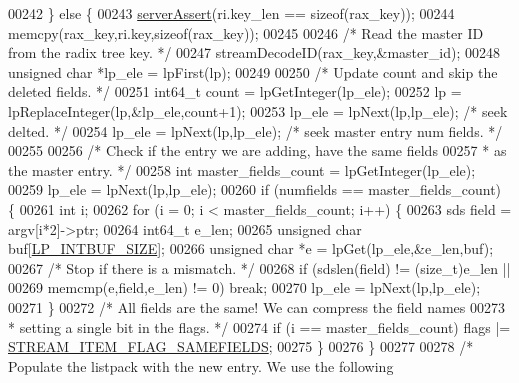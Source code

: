 \begin{DoxyCode}
{00242     \} \textcolor{keywordflow}{else} \{
00243         \hyperlink{server_8h_a88114b5169b4c382df6b56506285e56a}{serverAssert}(ri.key\_len == \textcolor{keyword}{sizeof}(rax\_key));
00244         memcpy(rax\_key,ri.key,\textcolor{keyword}{sizeof}(rax\_key));
00245 
00246         \textcolor{comment}{/* Read the master ID from the radix tree key. */}
00247         streamDecodeID(rax\_key,&master\_id);
00248         \textcolor{keywordtype}{unsigned} \textcolor{keywordtype}{char} *lp\_ele = lpFirst(lp);
00249 
00250         \textcolor{comment}{/* Update count and skip the deleted fields. */}
00251         int64\_t count = lpGetInteger(lp\_ele);
00252         lp = lpReplaceInteger(lp,&lp\_ele,count+1);
00253         lp\_ele = lpNext(lp,lp\_ele); \textcolor{comment}{/* seek delted. */}
00254         lp\_ele = lpNext(lp,lp\_ele); \textcolor{comment}{/* seek master entry num fields. */}
00255 
00256         \textcolor{comment}{/* Check if the entry we are adding, have the same fields}
00257 \textcolor{comment}{         * as the master entry. */}
00258         \textcolor{keywordtype}{int} master\_fields\_count = lpGetInteger(lp\_ele);
00259         lp\_ele = lpNext(lp,lp\_ele);
00260         \textcolor{keywordflow}{if} (numfields == master\_fields\_count) \{
00261             \textcolor{keywordtype}{int} i;
00262             \textcolor{keywordflow}{for} (i = 0; i < master\_fields\_count; i++) \{
00263                 sds field = argv[i*2]->ptr;
00264                 int64\_t e\_len;
00265                 \textcolor{keywordtype}{unsigned} \textcolor{keywordtype}{char} buf[\hyperlink{listpack_8h_ab31e5c173b595ae4e703b72eb435a6e9}{LP\_INTBUF\_SIZE}];
00266                 \textcolor{keywordtype}{unsigned} \textcolor{keywordtype}{char} *e = lpGet(lp\_ele,&e\_len,buf);
00267                 \textcolor{comment}{/* Stop if there is a mismatch. */}
00268                 \textcolor{keywordflow}{if} (sdslen(field) != (size\_t)e\_len ||
00269                     memcmp(e,field,e\_len) != 0) \textcolor{keywordflow}{break};
00270                 lp\_ele = lpNext(lp,lp\_ele);
00271             \}
00272             \textcolor{comment}{/* All fields are the same! We can compress the field names}
00273 \textcolor{comment}{             * setting a single bit in the flags. */}
00274             \textcolor{keywordflow}{if} (i == master\_fields\_count) flags |= 
      \hyperlink{t__stream_8c_a6977b456a646762a7650d432a06dc6c5}{STREAM\_ITEM\_FLAG\_SAMEFIELDS};
00275         \}
00276     \}
00277 
00278     \textcolor{comment}{/* Populate the listpack with the new entry. We use the following}
}
\end{DoxyCode}

